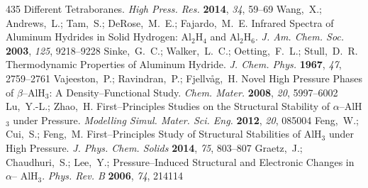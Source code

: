 \documentclass[12pt,letterpaper,oneside]{article}
\begin{document}
\begin{mcitethebibliography}{435}
  Different Tetraboranes. \emph{High Press. Res.} \textbf{2014}, \emph{34},
  59--69\relax
\mciteBstWouldAddEndPuncttrue
\mciteSetBstMidEndSepPunct{\mcitedefaultmidpunct}
{\mcitedefaultendpunct}{\mcitedefaultseppunct}\relax
\EndOfBibitem
{}
Wang,~X.; Andrews,~L.; Tam,~S.; DeRose,~M.~E.; Fajardo,~M.~E. Infrared Spectra
  of Aluminum Hydrides in Solid Hydrogen: Al$_2$H$_4$ and Al$_2$H$_6$. \emph{J.
  Am. Chem. Soc.} \textbf{2003}, \emph{125}, 9218--9228\relax
\mciteBstWouldAddEndPuncttrue
\mciteSetBstMidEndSepPunct{\mcitedefaultmidpunct}
{\mcitedefaultendpunct}{\mcitedefaultseppunct}\relax
\EndOfBibitem
{}
Sinke,~G.~C.; Walker,~L.~C.; Oetting,~F.~L.; Stull,~D.~R. Thermodynamic
  Properties of Aluminum Hydride. \emph{J. Chem. Phys.} \textbf{1967},
  \emph{47}, 2759--2761\relax
\mciteBstWouldAddEndPuncttrue
\mciteSetBstMidEndSepPunct{\mcitedefaultmidpunct}
{\mcitedefaultendpunct}{\mcitedefaultseppunct}\relax
\EndOfBibitem
{}
Vajeeston,~P.; Ravindran,~P.; Fjellv{\aa}g,~H. Novel High Pressure Phases of
  $\beta$--AlH$_3$: A Density--Functional Study. \emph{Chem. Mater.}
  \textbf{2008}, \emph{20}, 5997--6002\relax
\mciteBstWouldAddEndPuncttrue
\mciteSetBstMidEndSepPunct{\mcitedefaultmidpunct}
{\mcitedefaultendpunct}{\mcitedefaultseppunct}\relax
\EndOfBibitem
{}
Lu,~Y.-L.; Zhao,~H. First--Principles Studies on the Structural Stability of
  $\alpha$--AlH$_3$ under Pressure. \emph{Modelling Simul. Mater. Sci. Eng.}
  \textbf{2012}, \emph{20}, 085004\relax
\mciteBstWouldAddEndPuncttrue
\mciteSetBstMidEndSepPunct{\mcitedefaultmidpunct}
{\mcitedefaultendpunct}{\mcitedefaultseppunct}\relax
\EndOfBibitem
{}
Feng,~W.; Cui,~S.; Feng,~M. First--Principles Study of Structural Stabilities
  of AlH$_3$ under High Pressure. \emph{J. Phys. Chem. Solids} \textbf{2014},
  \emph{75}, 803--807\relax
\mciteBstWouldAddEndPuncttrue
\mciteSetBstMidEndSepPunct{\mcitedefaultmidpunct}
{\mcitedefaultendpunct}{\mcitedefaultseppunct}\relax
\EndOfBibitem
{}
Graetz,~J.; Chaudhuri,~S.; Lee,~Y.; 
  Pressure--Induced Structural and Electronic Changes in $\alpha$-- AlH$_3$.
  \emph{Phys. Rev. B} \textbf{2006}, \emph{74}, 214114\relax

\end{mcitethebibliography}
\end{document}
